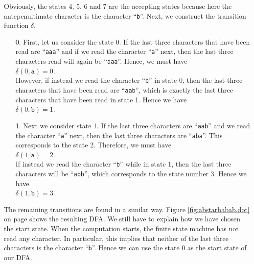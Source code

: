 Obviously, the states 4, 5, 6 and 7 are the accepting states because here the antepenultimate
character is the character ``\texttt{b}''.  Next, we construct the transition function $\delta$.
\begin{enumerate}
\item[0.] First, let us consider the state 0.  If the last three characters that have been read are
          ``\texttt{aaa}'' and if we read the character ``\texttt{a}'' next, then the last three
          characters read will again be ``\texttt{aaa}''.  Hence, we must have
          \\[0.2cm]
          \hspace*{1.3cm}
          $\delta(0, \mathtt{a}) = 0$.
          \\[0.2cm]
          However, if instead we read the character ``\texttt{b}'' in state 0, then the last three
          characters that have been read are ``\texttt{aab}'', which is exactly the last three
          characters that have been read in state 1.  Hence we have
          \\[0.2cm]
          \hspace*{1.3cm}
          $\delta(0, \mathtt{b}) = 1$.
\item[1.] Next we consider state 1.  If the last three characters are ``\texttt{aab}'' and we read
          the character ``\texttt{a}'' next, then the last three characters are ``\texttt{aba}''.
          This corresponds to the state  2.  Therefore, we must have
          \\[0.2cm]
          \hspace*{1.3cm}
          $\delta(1, \mathtt{a}) = 2$.
          \\[0.2cm]
          If instead we read the character  ``\texttt{b}'' while in state 1, then the last three
          characters will be ``\texttt{abb}'', which corresponds to the state number  3.  Hence we have
          \\[0.2cm]
          \hspace*{1.3cm}
          $\delta(1, \mathtt{b}) = 3$.
\end{enumerate}
The remaining transitions are found in a similar way.
Figure \ref{fig:abstarbabab.dot} on page \pageref{fig:abstarbabab.dot} shows the resulting \textsc{DFA}.
We still have to explain how we have chosen the start state.  When the computation starts, the
finite state machine has not read any character.  In particular, this implies that neither of the
last three characters is the character ``\texttt{b}''.   Hence we can use the state 0 as the start
state of our \textsc{DFA}.

